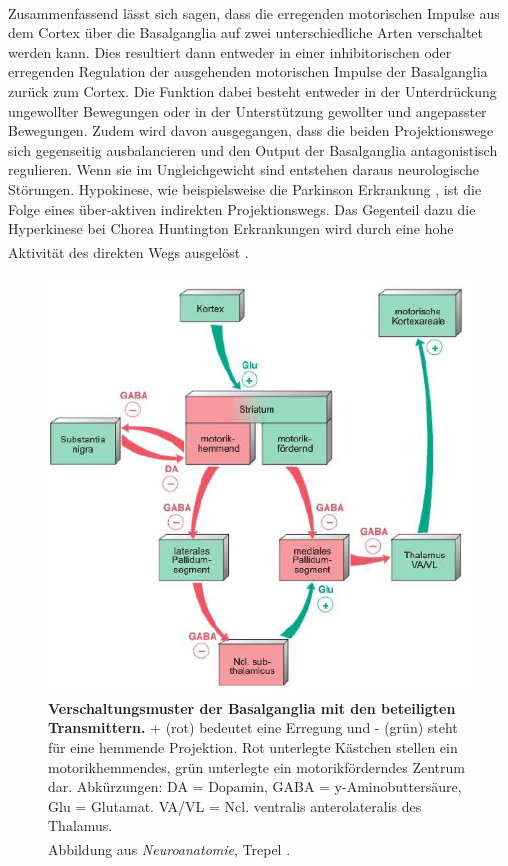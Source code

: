 \documentclass[12pt,a4paper,pdftex]{article}
\begin{document}
\\ \noindent Zusammenfassend lässt sich sagen, dass die erregenden motorischen Impulse aus dem Cortex über die Basalganglia auf zwei unterschiedliche Arten verschaltet werden kann. Dies resultiert dann entweder in einer inhibitorischen oder erregenden Regulation der ausgehenden motorischen Impulse der Basalganglia zurück zum Cortex. Die Funktion dabei besteht entweder in der Unterdrückung ungewollter Bewegungen oder in der Unterstützung gewollter und angepasster Bewegungen. Zudem wird davon ausgegangen, dass die beiden Projektionswege sich gegenseitig ausbalancieren und den Output der Basalganglia antagonistisch regulieren. Wenn sie im Ungleichgewicht sind entstehen daraus neurologische Störungen. Hypokinese, wie beispielsweise die Parkinson Erkrankung , ist die Folge eines über-aktiven indirekten Projektionswegs. Das Gegenteil dazu die Hyperkinese bei Chorea Huntington  Erkrankungen wird durch eine hohe Aktivität des direkten Wegs ausgelöst \textsuperscript{\cite[17]{paxinos2014rat}}. 

\begin{figure}[H]
    \centering
    \includegraphics{pictures/Basalganglia/verschaltung_Basalganglien.PNG}
    \caption[Verschaltungsmuster der Basalganglia mit den beteiligten Transmittern]{\textbf{Verschaltungsmuster der Basalganglia mit den beteiligten Transmittern.} + (rot) bedeutet eine Erregung und - (grün)  steht für eine hemmende Projektion. Rot unterlegte Kästchen stellen ein motorikhemmendes, grün unterlegte ein motorikförderndes Zentrum dar. Abkürzungen: DA = Dopamin, GABA = y-Aminobuttersäure, Glu = Glutamat. VA/VL = Ncl. ventralis anterolateralis des Thalamus. \\ Abbildung aus \textit{Neuroanatomie}, Trepel \textsuperscript{\cite[9]{trepel2011neuroanatomie}}.}
    \label{fig:Verschaltung_Basalganglia}
\end{figure}
\end{document}
